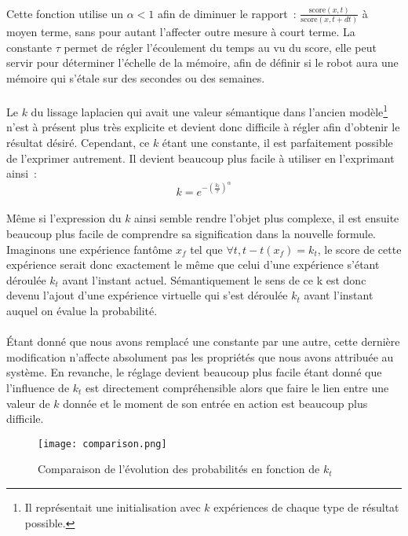 \paragraph{}
Cette fonction utilise un $\alpha < 1$ afin de diminuer le rapport~:
$\frac{\mathrm{score}(x,t)}{\mathrm{score}(x, t + dt)}$ à moyen terme, sans
pour autant l'affecter outre mesure à court terme. La constante $\tau$ permet
de régler l'écoulement du temps au vu du score, elle peut servir pour
déterminer l'échelle de la mémoire, afin de définir si le robot aura une
mémoire qui s'étale sur des secondes ou des semaines.


\paragraph{}
Le $k$ du lissage laplacien qui avait une valeur sémantique dans l'ancien
modèle\footnote{Il représentait une initialisation avec $k$ expériences de
chaque type de résultat possible.} n'est à présent plus très explicite et
devient donc difficile à régler afin d'obtenir le résultat désiré. Cependant,
ce $k$ étant une constante, il est parfaitement possible de l'exprimer
autrement. Il devient beaucoup plus facile à utiliser en l'exprimant ainsi~:
$$k = e^{-\left (\frac{k_t}{\tau} \right )^{\alpha}}$$

\paragraph{}
Même si l'expression du $k$ ainsi semble rendre l'objet plus complexe, il est
ensuite beaucoup plus facile de comprendre sa signification dans la nouvelle
formule. Imaginons une expérience fantôme $x_f$ tel que
$\forall t, t - t(x_f) = k_t$, le score de cette expérience serait donc
exactement le même que celui d'une expérience s'étant déroulée $k_t$ avant
l'instant actuel. Sémantiquement le sens de ce k est donc devenu l'ajout d'une
expérience virtuelle qui s'est déroulée $k_t$ avant l'instant auquel on évalue
la probabilité.

\paragraph{}
Étant donné que nous avons remplacé une constante par une autre, cette
dernière modification n'affecte absolument pas les propriétés que nous avons
attribuée au système. En revanche, le réglage devient beaucoup plus facile
étant donné que l'influence de $k_t$ est directement compréhensible alors
que faire le lien entre une valeur de $k$ donnée et le moment de son entrée en
action est beaucoup plus difficile.


\begin{figure}[H]
  \caption{Comparaison de l'évolution des probabilités en fonction de $k_t$}
  \texttt{[image: comparison.png]}
\end{figure}
